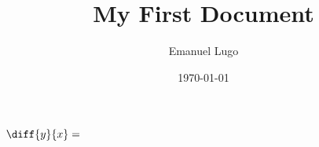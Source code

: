 \documentclass[a4paper,12pt]{article}
\begin{document}
\title{My First Document}
\author{Emanuel Lugo}
\date{\today}
\maketitle

$\diff{y}{x} = $


 
\end{document}
